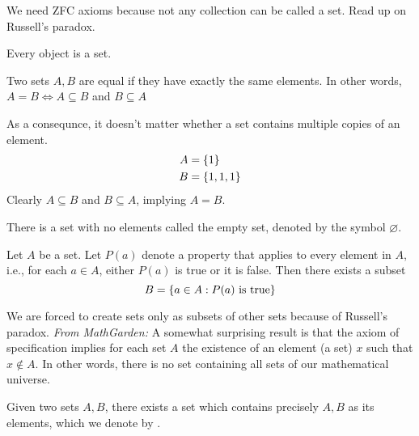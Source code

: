 \documentclass[12pt]{article}
\begin{document}
\begin{rem}
    We need ZFC axioms because not any collection can be called a set. Read up on Russell's paradox.
\end{rem}

\begin{axiom} \label{zfc:basic}
    Every object is a set.
\end{axiom}

\begin{axiom} \label{zfc:extension}
    Two sets $A, B$ are equal if they have exactly the same elements. In other words, $A = B \iff A \subseteq B$ and $B \subseteq A$
\end{axiom}

\begin{rem}
    As a consequnce, it doesn't matter whether a set contains multiple copies of an element.
    \begin{align*}
        A &= \set{ 1 } \\
        B &= \set{ 1, 1, 1 }
    \end{align*}
    Clearly $A \subseteq B$ and $B \subseteq A$, implying $A = B$.
\end{rem}

\begin{axiom} \label{zfc:existence}
    There is a set with no elements called the empty set, denoted by the symbol $\varnothing$.
\end{axiom}

\begin{axiom} \label{zfc:specification}
    Let $A$ be a set. Let $P(a)$ denote a property that applies to every element in $A$, i.e., for each $a \in A$, either $P(a)$ is true or it is false. Then there exists a subset
    \[
        B = \set{a \in A: P(a) \text{ is true}}
    \]
\end{axiom}

\begin{rem}
    We are forced to create sets only as subsets of other sets because of Russell's paradox. \textcolor{red!85!black}{\emph{From MathGarden:} A somewhat surprising result is that the axiom of specification implies for each set $A$ the existence of an element (a set) $x$ such that $x \not\in A$. In other words, there is no set containing all sets of our mathematical universe.}
\end{rem}

\begin{axiom}\label{zfc:pairing}
    Given two sets $A, B$, there exists a set which contains precisely $A, B$ as its elements, which we denote by .
\end{axiom}
\end{document}
